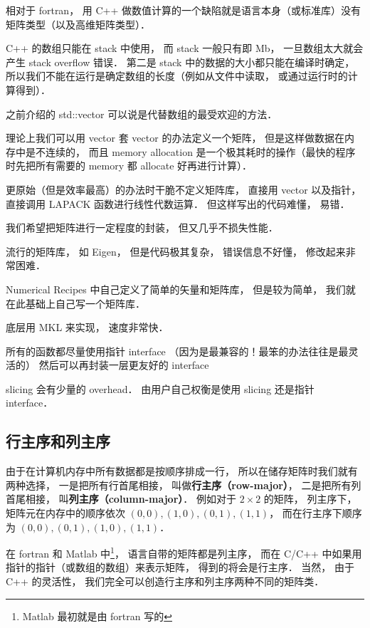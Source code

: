 
相对于 fortran， 用 C++ 做数值计算的一个缺陷就是语言本身（或标准库）没有矩阵类型（以及高维矩阵类型）．

C++ 的数组只能在 stack 中使用， 而 stack 一般只有即 Mb， 一旦数组太大就会产生 stack overflow 错误． 第二是 stack 中的数据的大小都只能在编译时确定， 所以我们不能在运行是确定数组的长度（例如从文件中读取， 或通过运行时的计算得到）．

之前介绍的  std::vector 可以说是代替数组的最受欢迎的方法．

理论上我们可以用 vector 套 vector 的办法定义一个矩阵， 但是这样做数据在内存中是不连续的， 而且 memory allocation 是一个极其耗时的操作（最快的程序时先把所有需要的 memory 都 allocate 好再进行计算）．

更原始（但是效率最高）的办法时干脆不定义矩阵库， 直接用 vector 以及指针， 直接调用 LAPACK 函数进行线性代数运算． 但这样写出的代码难懂， 易错．

我们希望把矩阵进行一定程度的封装， 但又几乎不损失性能．

流行的矩阵库， 如 Eigen， 但是代码极其复杂， 错误信息不好懂， 修改起来非常困难．

Numerical Recipes 中自己定义了简单的矢量和矩阵库， 但是较为简单， 我们就在此基础上自己写一个矩阵库．

底层用 MKL 来实现， 速度非常快．

所有的函数都尽量使用指针 interface （因为是最兼容的！最笨的办法往往是最灵活的） 然后可以再封装一层更友好的 interface

slicing 会有少量的 overhead． 由用户自己权衡是使用 slicing 还是指针 interface．

\subsection{行主序和列主序}
由于在计算机内存中所有数据都是按顺序排成一行， 所以在储存矩阵时我们就有两种选择， 一是把所有行首尾相接， 叫做\textbf{行主序（row-major）}， 二是把所有列首尾相接， 叫\textbf{列主序（column-major）}． 例如对于 $2 \times 2$ 的矩阵， 列主序下， 矩阵元在内存中的顺序依次 $(0, 0), (1, 0), (0, 1), (1, 1)$， 而在行主序下顺序为 $(0, 0), (0, 1), (1, 0), (1, 1)$．

在 fortran 和 Matlab 中\footnote{Matlab 最初就是由 fortran 写的}， 语言自带的矩阵都是列主序， 而在 C/C++ 中如果用指针的指针（或数组的数组）来表示矩阵， 得到的将会是行主序． 当然， 由于 C++ 的灵活性， 我们完全可以创造行主序和列主序两种不同的矩阵类．

